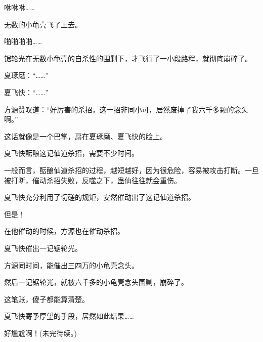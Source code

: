 \begin{this_body}
咻咻咻……

无数的小龟壳飞了上去。

啪啪啪啪……

锯轮光在无数小龟壳的自杀性的围剿下，才飞行了一小段路程，就彻底崩碎了。

夏琢磨：“……”

夏飞快：“……”

方源赞叹道：“好厉害的杀招，这一招非同小可，居然废掉了我六千多颗的念头啊。”

这话就像是一个巴掌，扇在夏琢磨、夏飞快的脸上。

夏飞快酝酿这记仙道杀招，需要不少时间。

一般而言，酝酿仙道杀招的过程，越短越好，因为很危险，容易被攻击打断。一旦被打断，催动杀招失败，反噬之下，蛊仙往往就会重伤。

夏飞快充分利用了切磋的规矩，安然催动出了这记仙道杀招。

但是！

在他催动的时候，方源也在催动杀招。

夏飞快催出一记锯轮光。

方源同时间，能催出三四万的小龟壳念头。

然后一记锯轮光，就被六千多的小龟壳念头围剿，崩碎了。

这笔账，傻子都能算清楚。

夏飞快寄予厚望的手段，居然如此结果……

好尴尬啊！(未完待续。)

\end{this_body}

